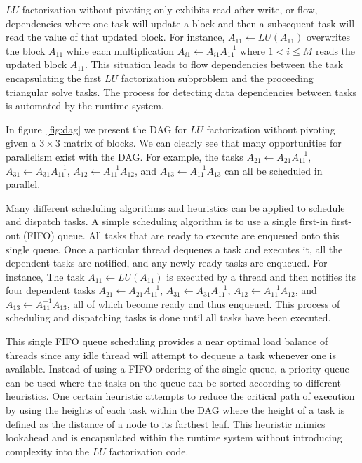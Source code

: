 $LU$ factorization without pivoting only exhibits read-after-write, or
flow, dependencies where one task will update a block and then a
subsequent task will read the value of that updated block.
For instance,
$A_{11} \leftarrow LU( A_{11} )$ overwrites the block $A_{11}$
while each multiplication 
$A_{i1} \leftarrow A_{i1} A_{11}^{-1}$ where $1 < i \leq M$
reads the updated block $A_{11}$. %
This situation leads to flow dependencies between the task
encapsulating the first $LU$ factorization subproblem and the
proceeding triangular solve tasks.
The process for detecting data dependencies between tasks is automated
by the runtime system.

In figure~\ref{fig:dag} we present the \ac{DAG} for $LU$ factorization
without pivoting given a 
$3 \times 3$ matrix of blocks.
We can clearly see that many opportunities for parallelism exist with
the \ac{DAG}.
For example, the tasks 
$A_{21} \leftarrow A_{21} A_{11}^{-1}$,
$A_{31} \leftarrow A_{31} A_{11}^{-1}$,
$A_{12} \leftarrow A_{11}^{-1} A_{12}$, and
$A_{13} \leftarrow A_{11}^{-1} A_{13}$
can all be scheduled in parallel.

Many different scheduling algorithms and heuristics can be applied to
schedule and dispatch tasks.
A simple scheduling algorithm is to use a single first-in first-out
(FIFO) queue.
All tasks that are ready to execute are enqueued onto this single
queue.
Once a particular thread dequeues a task and executes it, all the
dependent tasks are notified, and any newly ready tasks are enqueued.
For instance,
The task $A_{11} \leftarrow LU( A_{11} )$ is executed by a thread and
then notifies its four dependent tasks
$A_{21} \leftarrow A_{21} A_{11}^{-1}$,
$A_{31} \leftarrow A_{31} A_{11}^{-1}$,
$A_{12} \leftarrow A_{11}^{-1} A_{12}$, and
$A_{13} \leftarrow A_{11}^{-1} A_{13}$,
all of which become ready and thus enqueued.
This process of scheduling and dispatching tasks is done until all
tasks have been executed.

This single FIFO queue scheduling provides a near optimal load balance
of threads since any idle thread will attempt to dequeue a task
whenever one is available.
Instead of using a FIFO ordering of the single queue, a priority queue
can be used where the tasks on the queue can be sorted according to
different heuristics.
One certain heuristic attempts to reduce the critical path of
execution by using the heights of each task within the \ac{DAG} where the
height of a task is defined as the distance of a node to its farthest
leaf.  %
This heuristic mimics lookahead and is encapsulated within the runtime
system without introducing complexity into the $LU$ factorization
code.

